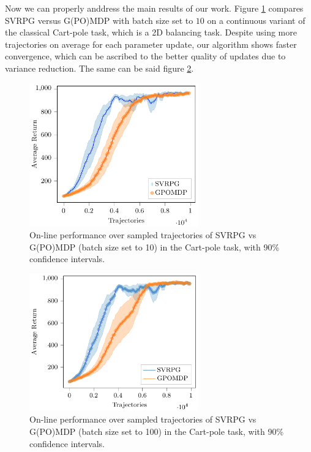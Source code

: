 Now we can properly anddress the main results of our work. Figure \ref{fig:cartpole} compares \acs{SVRPG} versus G(PO)MDP with batch size set to $10$ on a continuous variant of the classical Cart-pole task, which is a 2D balancing task. Despite using more trajectories on average for each parameter update, our algorithm shows faster convergence, which can be ascribed to the better quality of updates due to variance reduction. The same can be said \wrt figure \ref{fig:cartpole100}.
\begin{figure}[h]
	\begin{minipage}[h]{1\textwidth}
		\centering
		\includegraphics[width=0.65\textwidth]{Images/Experiments/cart_pole_SVRPG_vs_GPOMDP_tex.pdf}
		\vspace{-0.1in}
		\caption{On-line performance over sampled trajectories of \acs{SVRPG} vs G(PO)MDP (batch size set to 10) in the Cart-pole task, with 90\% confidence intervals.}
		\label{fig:cartpole}
	\end{minipage}
	\vspace{-0.15in}
\end{figure}
\begin{figure}[h]
	\begin{minipage}[h]{1\textwidth}
		\centering
		\includegraphics[width=0.65\textwidth]{Images/Experiments/cart_pole_GPOMDP_100_vs_SVRPG.pdf}
		\vspace{-0.1in}
		\caption{On-line performance over sampled trajectories of \acs{SVRPG} vs G(PO)MDP (batch size set to 100) in the Cart-pole task, with 90\% confidence intervals.}
		\label{fig:cartpole100}
	\end{minipage}
	\vspace{-0.15in}
\end{figure}
